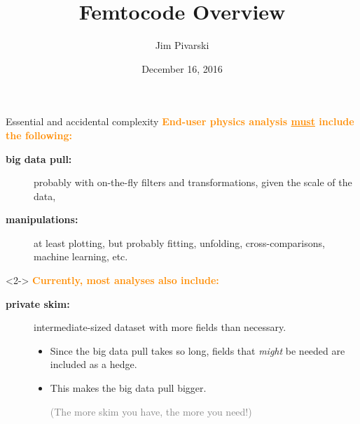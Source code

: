 \documentclass{beamer}
\title[2016-12-16-femtocode-overview]{Femtocode Overview}
\author{Jim Pivarski}
\institute{Princeton University -- DIANA}
\date{December 16, 2016}
\begin{document}

\begin{frame}
  \titlepage
\end{frame}




\begin{frame}{Essential and accidental complexity}
\vspace{0.25 cm}
\textcolor{darkorange}{\bf End-user physics analysis \underline{must} include the following:}
\begin{description}
\item[\bf big data pull:] probably with on-the-fly filters and transformations, given the scale of the data,
\item[\bf manipulations:] at least plotting, but probably fitting, unfolding, cross-comparisons, machine learning, etc.
\end{description}

\vfill
\begin{uncoverenv}<2->
\textcolor{darkorange}{\bf Currently, most analyses also include:}
\begin{description}
\item[\bf private skim:] intermediate-sized dataset with more fields than necessary.
\begin{itemize}
\item Since the big data pull takes so long, fields that {\it might} be needed are included as a hedge.
\item This makes the big data pull bigger.

\textcolor{gray}{(The more skim you have, the more you need!)}
\end{itemize}
\end{description}
\end{uncoverenv}
\end{frame}
\end{document}
